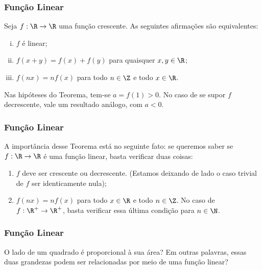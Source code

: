 \documentclass[10pt]{beamer}
\begin{document}

\begin{frame}
\frametitle{Função Linear} 

\begin{teorema}
Seja $f: \R \to \R$ uma função crescente. As seguintes afirmações
são equivalentes:
\begin{enumerate}[(i)]
	\item  $f$ é linear;
	\item $f(x+y) = f(x) + f(y)$ para quaisquer $x, y \in \R$;
	\item $f(nx) = nf(x)$ para todo $n \in \Z$ e todo $x \in \R$.
\end{enumerate}
\end{teorema}
Nas hipóteses do Teorema, tem-se $a=f(1) > 0$. No caso de se supor
$f$ decrescente, vale um resultado análogo, com $a<0$.

\end{frame}


\begin{frame}
\frametitle{Função Linear} 

A importância desse Teorema está no seguinte fato: se queremos saber
se $f: \R \to \R$ é uma função linear, basta verificar duas coisas:
\begin{enumerate}[1ª:]
	\item $f$ deve ser crescente ou decrescente. (Estamos deixando de
	lado o caso trivial de $f$ ser identicamente nula);
	\item $f(nx) = n f(x)$ para todo $x \in \R$ e todo $n \in \Z$. No
	caso de $f: \R^+ \to \R^+$, basta verificar essa última condição
	para $n \in \N$.
\end{enumerate}

\end{frame}



\begin{frame}
\frametitle{Função Linear} 

\begin{exemplo}
O lado de um quadrado é proporcional à sua área? Em outras palavras,
essas duas grandezas podem ser relacionadas por meio de uma função
linear?
\end{exemplo}

\end{frame}
\end{document}
